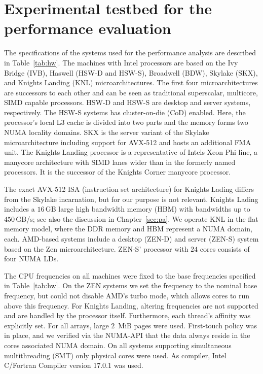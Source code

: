 \section{Experimental testbed for the performance evaluation}
\label{sec:tb}

The specifications of the systems used for the performance analysis are described
in Table~\ref{tab:hw}.
%
The machines with Intel processors are based on the Ivy Bridge (IVB), Haswell
(HSW-D and HSW-S), Broadwell (BDW), Skylake (SKX), and Knights Landing (KNL)
microarchitectures.
The first four microarchitectures are successors to each other and can be seen
as traditional superscalar, multicore, SIMD capable processors.
HSW-D and HSW-S are desktop and server systems, respectively.
The HSW-S systems has cluster-on-die (CoD) enabled.
Here, the processor's local L3 cache is divided into two parts and the memory
forms two NUMA locality domains.
%
SKX is the server variant of the Skylake microarchitecture including support for
AVX-512 and hosts an additional FMA unit.
%
The Knights Landing processor is
a representative of Intels Xeon Phi line, a manycore
architecture with SIMD lanes wider than in the formerly named processors.
It is the successor of the Knights Corner manycore processor.

The exact AVX-512 ISA (instruction set architecture) for Knights Lading differs from the Skylake incarnation,
but for our purpose is not relevant.
Knights Lading includes a $16$\,GB large high bandwidth memory (HBM) with
bandwidths up to $450$\,GB/s; see also the discussion in Chapter~\ref{sec:pa}.
We operate KNL in the flat memory model, where the DDR memory and HBM
represent a NUMA domain, each.
%
AMD-based systems include a desktop (ZEN-D) and server (ZEN-S) system based on the Zen
microarchitecture.
ZEN-S' processor with $24$ cores consists of four NUMA LDs.
%

The CPU frequencies on all machines were fixed to the base frequencies specified
in Table~\ref{tab:hw}.
On the ZEN systems we set the frequency to the nominal base frequency, but could
not disable AMD's turbo mode, which allows cores to run above this frequency.
For Knights Landing, altering frequencies are not supported and are handled by the
processor itself.
%
Furthermore, each thread's affinity was explicitly set.
%
For all arrays, large $2$~MiB pages were used.
%
First-touch policy was in place, and we verified via the NUMA-API that the data
always reside in the cores associated NUMA domain.
%
On all systems supporting simultaneous multithreading (SMT) only physical cores were used.
%
As compiler, Intel C/Fortran Compiler version 17.0.1 was used.

